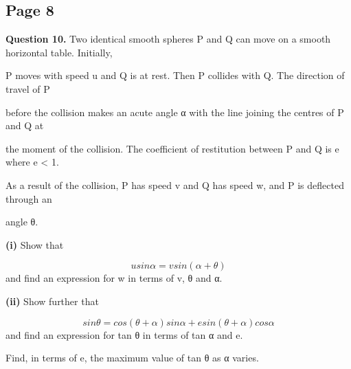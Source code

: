 \documentclass[12pt]{article}
\begin{document}
\subsection*{Page 8}
\begin{flushleft}
\bigskip\textbf{Question 10.} Two identical smooth spheres P and Q can move on a smooth horizontal table. Initially,\par
P moves with speed u and Q is at rest. Then P collides with Q. The direction of travel of P\par
before the collision makes an acute angle α with the line joining the centres of P and Q at\par
the moment of the collision. The coefficient of restitution between P and Q is e where e < 1.\par
As a result of the collision, P has speed v and Q has speed w, and P is deflected through an\par
angle θ.\par
\textbf{(i)} Show that\par
\[u sin α = v sin(α + θ)\]
and find an expression for w in terms of v, θ and α.\par
\textbf{(ii)} Show further that\par
\[sin θ = cos(θ + α) sin α + e sin(θ + α) cos α\]
and find an expression for tan θ in terms of tan α and e.\par
Find, in terms of e, the maximum value of tan θ as α varies.\par
\end{flushleft}
\end{document}
